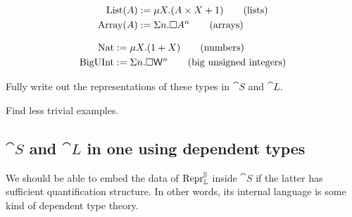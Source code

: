 \begin{align}
  \mathrm{List}(A)  & := \mu X . (A \times X + 1) \tag{lists} \\
  \mathrm{Array}(A) & := \Sigma n . \square A ^n \tag{arrays}
\end{align}

\begin{align}
  \mathrm{Nat}     & := \mu X . (1 + X) \tag{numbers}                             \\
  \mathrm{BigUInt} & := \Sigma n . \square \mathsf{W} ^n \tag{big unsigned integers}
\end{align}

Fully write out the representations of these types in $\cat S$ and $\cat L$.

Find less trivial examples.

\subsection{$\cat S$ and $\cat L$ in one using dependent types}

We should be able to embed the data of $\mathrm{Repr} ^{\mathbb S} _{\mathbb L}$ inside $\cat
  S$ if the latter has sufficient quantification structure. In other words, its
internal language is some kind of dependent type theory.
